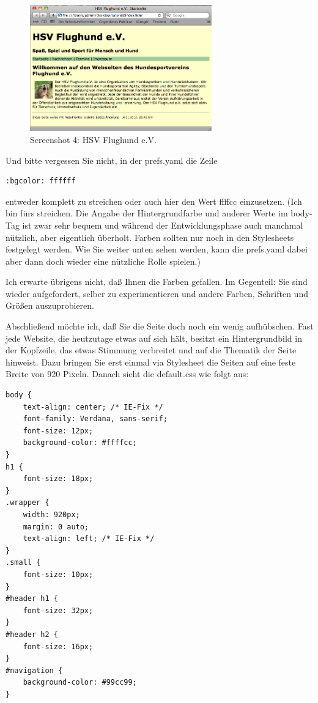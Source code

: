 \documentclass[11pt]{report}
\begin{document}
\begin{figure}[h!]
\centering
\includegraphics[width=0.7\textwidth]{./images/flughund04.png}
\caption{\label{flughund04}Screenshot 4: HSV Flughund e.V.}
\end{figure}


Und bitte vergessen Sie nicht, in der prefs.yaml die Zeile


\begin{verbatim}
:bgcolor: ffffff
\end{verbatim}

entweder komplett zu streichen oder auch hier den Wert ffffcc
einzusetzen. (Ich bin fürs streichen. Die Angabe der Hintergrundfarbe
und anderer Werte im body-Tag ist zwar sehr bequem und während der
Entwicklungsphase auch manchmal nützlich, aber eigentlich
überholt. Farben sollten nur noch in den Stylesheets festgelegt
werden. Wie Sie weiter unten sehen werden, kann die prefs.yaml dabei
aber dann doch wieder eine nützliche Rolle spielen.)


Ich erwarte übrigens nicht, daß Ihnen die Farben gefallen. Im
Gegenteil: Sie sind wieder aufgefordert, selber zu experimentieren und
andere Farben, Schriften und Größen auszuprobieren.


Abschließend möchte ich, daß Sie die Seite doch noch ein wenig
aufhübschen. Fast jede Website, die heutzutage etwas auf sich hält,
besitzt ein Hintergrundbild in der Kopfzeile, das etwas Stimmung
verbreitet und auf die Thematik der Seite hinweist. Dazu bringen Sie
erst einmal via Stylesheet die Seiten auf eine feste Breite von 920
Pixeln. Danach sieht die default.css wie folgt aus:


\begin{verbatim}
body {
    text-align: center; /* IE-Fix */
    font-family: Verdana, sans-serif;
    font-size: 12px;
    background-color: #ffffcc;
}
h1 {
    font-size: 18px;
}
.wrapper {
    width: 920px;
    margin: 0 auto;
    text-align: left; /* IE-Fix */
}
.small {
    font-size: 10px;
}
#header h1 {
    font-size: 32px;
}
#header h2 {
    font-size: 16px;
}
#navigation {
    background-color: #99cc99;
}
\end{verbatim}
\end{document}
